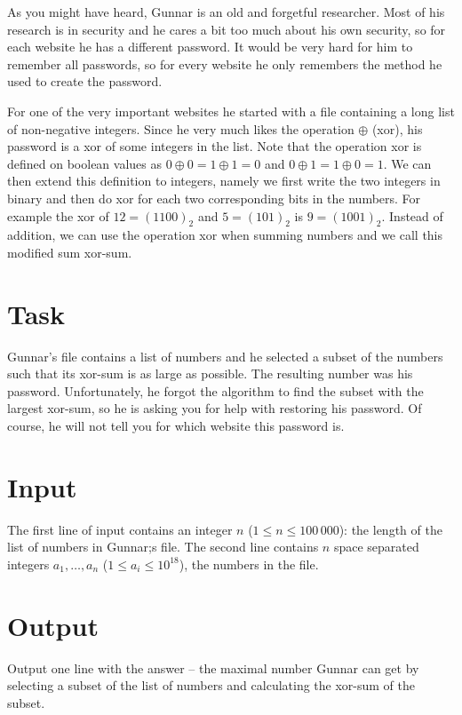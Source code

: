 As you might have heard, Gunnar is an old and forgetful researcher.
Most of his research is in security and he cares a bit too much about his own security, so for each website he has a different password.
It would be very hard for him to remember all passwords, so for every website he only remembers the method he used to create the password.

For one of the very important websites he started with a file containing a long list of non-negative integers.
Since he very much likes the operation $\oplus$ (xor), his password is a xor of some integers in the list.
Note that the operation xor is defined on boolean values as $0 \oplus 0 = 1 \oplus 1 = 0$ and $0 \oplus 1 = 1 \oplus 0 = 1$.
We can then extend this definition to integers, namely we first write the two integers in binary and then do xor for each two corresponding bits in the numbers.
For example the xor of $12 = (1100)_2$ and $5 = (101)_2$ is $9 = (1001)_2$.
Instead of addition, we can use the operation xor when summing numbers and we call this modified sum xor-sum.

\section*{Task}
Gunnar's file contains a list of numbers and he selected a subset of the numbers such that its xor-sum is as large as
possible. The resulting number was his password. Unfortunately, he forgot the algorithm to find the subset with
the largest xor-sum, so he is asking you for help with restoring his password. Of course, he will not tell you for
which website this password is.

\section*{Input}
The first line of input contains an integer $n$ ($1 \le n \le 100\,000$): the length of the list of numbers in Gunnar;s file.
The second line contains $n$ space separated integers $a_1, \dots, a_n$ ($1 \le a_i \le 10^{18}$), the numbers in the file.

\section*{Output}
Output one line with the answer -- the maximal number Gunnar can get by selecting a subset of the list of numbers
and calculating the xor-sum of the subset.
